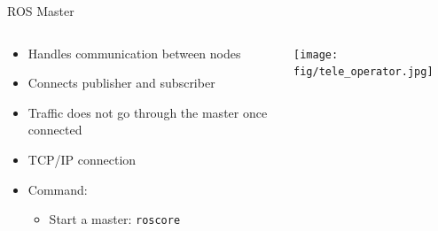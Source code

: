 \documentclass[aspectratio=43]{beamer}
\newcommand{\inline}[1]{\texttt{#1}}
\begin{document}
\begin{frame}{ROS Master}
	\begin{columns}[T]
		\begin{column}{0.6\textwidth}
			\begin{itemize}
			\item Handles communication between nodes
			\item Connects publisher and subscriber
			\item Traffic does \alert{not} go through the master once connected
			\item TCP/IP connection
			\item Command:
				\begin{itemize}
					\item Start a master: \inline{roscore}
				\end{itemize}
			\end{itemize}
		\end{column}
		\begin{column}{0.4\textwidth}
			\centering
			\texttt{[image: fig/tele\_operator.jpg]}
		\end{column}
	\end{columns}
\end{frame}
\end{document}
